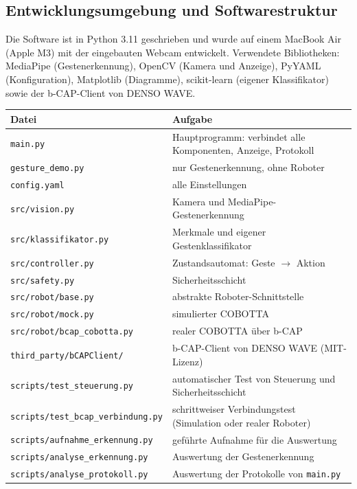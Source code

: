 \documentclass[11pt,a4paper]{article}
\newcommand{\datei}[1]{\texttt{#1}}
\begin{document}
\subsection{Entwicklungsumgebung und Softwarestruktur}

Die Software ist in Python 3.11 geschrieben und wurde auf einem MacBook Air (Apple M3) mit der
eingebauten Webcam entwickelt. Verwendete Bibliotheken: MediaPipe (Gestenerkennung), OpenCV
(Kamera und Anzeige), PyYAML (Konfiguration), Matplotlib (Diagramme), scikit-learn (eigener
Klassifikator) sowie der b-CAP-Client von DENSO WAVE.

\begin{table}[H]
\centering
\small
\begin{tabularx}{\textwidth}{>{\raggedright\arraybackslash}p{6.1cm}>{\raggedright\arraybackslash}X}
\toprule
Datei & Aufgabe \\
\midrule
\datei{main.py} & Hauptprogramm: verbindet alle Komponenten, Anzeige, Protokoll \\
\datei{gesture\_demo.py} & nur Gestenerkennung, ohne Roboter \\
\datei{config.yaml} & alle Einstellungen \\
\datei{src/vision.py} & Kamera und MediaPipe-Gestenerkennung \\
\datei{src/klassifikator.py} & Merkmale und eigener Gestenklassifikator \\
\datei{src/controller.py} & Zustandsautomat: Geste $\rightarrow$ Aktion \\
\datei{src/safety.py} & Sicherheitsschicht \\
\datei{src/robot/base.py} & abstrakte Roboter-Schnittstelle \\
\datei{src/robot/mock.py} & simulierter COBOTTA \\
\datei{src/robot/bcap\_cobotta.py} & realer COBOTTA über b-CAP \\
\datei{third\_party/bCAPClient/} & b-CAP-Client von DENSO WAVE (MIT-Lizenz) \\
\datei{scripts/test\_steuerung.py} & automatischer Test von Steuerung und Sicherheitsschicht \\
\datei{scripts/test\_bcap\_verbindung.py} & schrittweiser Verbindungstest (Simulation oder realer Roboter) \\
\datei{scripts/aufnahme\_erkennung.py} & geführte Aufnahme für die Auswertung \\
\datei{scripts/analyse\_erkennung.py} & Auswertung der Gestenerkennung \\
\datei{scripts/analyse\_protokoll.py} & Auswertung der Protokolle von \datei{main.py} \\

\end{tabularx}
\end{table}
\end{document}
